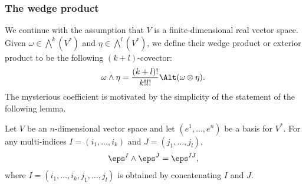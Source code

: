 \subsubsection{The wedge product}
We continue with the assumption that $V$ is a finite-dimensional real vector space.
Given $\omega\in\bigwedge^k(V^*)$ and $\eta\in\bigwedge^l(V^*)$, we define their wedge product or exterior product to be the following $(k+l)$-covector:
\begin{align}\label{wedge product def}
\omega\wedge\eta=\frac{(k+l)!}{k!l!}\Alt(\omega\otimes\eta).
\end{align}
The mysterious coefficient is motivated by the simplicity of the statement of the
following lemma.
\begin{lemma}\label{wedge prod form}
Let $V$ be an $n$-dimensional vector space and let $(e^1,\dots,e^n)$ be a basis for $V^*$. For any multi-indices $I=(i_1,\dots,i_k)$ and $J=(j_1,\dots,j_l)$,
\begin{align}\label{wedge product ele form-1}
\eps^I\wedge\eps^J=\eps^{IJ},
\end{align}
where $I=(i_1,\dots,i_k,j_1,\dots,j_l)$ is obtained by concatenating $I$ and $J$.
\end{lemma}
